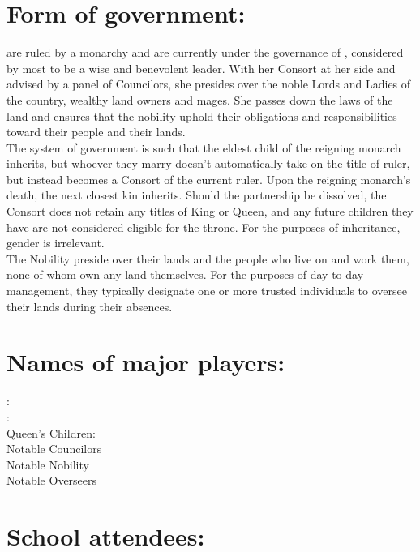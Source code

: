 \documentclass[blue]{GL2020}
\begin{document}
\name{\bAgrarians{}}

\section{Form of government:}

\pSun{} are ruled by a monarchy and are currently under the governance of \cQueen{}, considered by most to be a wise and benevolent leader.  With her Consort at her side and advised by a panel of Councilors, she presides over the noble Lords and Ladies of the country, wealthy land owners and mages.  She passes down the laws of the land and ensures that the nobility uphold their obligations and responsibilities toward their people and their lands.\\

The system of government is such that the eldest child of the reigning monarch inherits, but whoever they marry doesn't automatically take on the title of ruler, but instead becomes a Consort of the current ruler.  Upon the reigning monarch's death, the next closest kin inherits.  Should the partnership be dissolved, the Consort does not retain any titles of King or Queen, and any future children they have are not considered eligible for the throne.  For the purposes of inheritance, gender is irrelevant.\\

The Nobility preside over their lands and the people who live on and work them, none of whom own any land themselves.  For the purposes of day to day management, they typically designate one or more trusted individuals to oversee their lands during their absences.\\

\section{Names of major players:}

\pQueen{}:\\
\pConsort{}:\\
Queen's Children:\\
Notable Councilors\\
Notable Nobility\\
Notable Overseers\\

\section{School attendees:}
\end{document}
